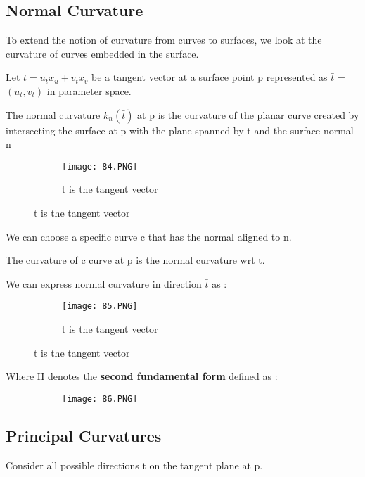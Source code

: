 \documentclass{article}
\begin{document}
\subsection{Normal Curvature}

To extend the notion of curvature from curves to surfaces, we look at the curvature of curves embedded in the surface.

Let $t = u_tx_u + v_tx_v$ be a tangent vector at a surface point p represented as $\bar t$ = $(u_t,v_t)$ in parameter space.

The normal curvature $k_n(\bar t) $ at p is the curvature of the planar curve created by intersecting the surface at p with the plane spanned by t and the surface normal n

    \begin{figure}[ht!]
  \centering
  \begin{subfigure}[b]{0.5\linewidth}
    \texttt{[image: 84.PNG]}
    \caption{t is the tangent vector}
  \end{subfigure}
\end{figure}


We can choose a specific curve c that has the normal aligned to n.

The curvature of c curve at p is the normal curvature wrt t.

We can express normal curvature in direction $\bar t$ as :

    \begin{figure}[ht!]
  \centering
  \begin{subfigure}[b]{0.5\linewidth}
    \texttt{[image: 85.PNG]}
    \caption{t is the tangent vector}
  \end{subfigure}
\end{figure}

Where II denotes the \textbf{second fundamental form} defined as :

    \begin{figure}[ht!]
  \centering
  \begin{subfigure}[b]{0.5\linewidth}
    \texttt{[image: 86.PNG]}
  \end{subfigure}
\end{figure}

\subsection{Principal Curvatures}

Consider all possible directions t on the tangent plane at p.
\end{document}
